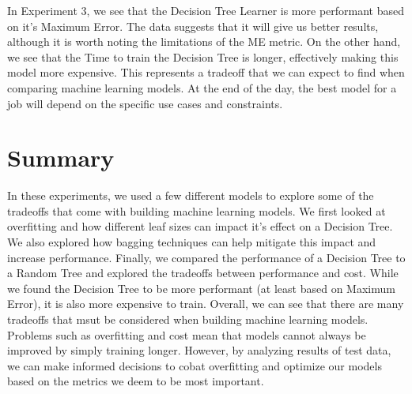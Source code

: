 \documentclass[
	letterpaper, %
]{jdf}
\begin{document}
In Experiment 3, we see that the Decision Tree Learner is more performant based on it's Maximum Error.
The data suggests that it will give us better results, although it is worth noting the limitations of the ME metric.
On the other hand, we see that the Time to train the Decision Tree is longer, effectively making this model more expensive.
This represents a tradeoff that we can expect to find when comparing machine learning models.
At the end of the day, the best model for a job will depend on the specific use cases and constraints.

\section{Summary}
In these experiments, we used a few different models to explore some of the tradeoffs that come with building machine learning models.
We first looked at overfitting and how different leaf sizes can impact it's effect on a Decision Tree.
We also explored how bagging techniques can help mitigate this impact and increase performance.
Finally, we compared the performance of a Decision Tree to a Random Tree and explored the tradeoffs between performance and cost.
While we found the Decision Tree to be more performant (at least based on Maximum Error), it is also more expensive to train.
Overall, we can see that there are many tradeoffs that msut be considered when building machine learning models.
Problems such as overfitting and cost mean that models cannot always be improved by simply training longer.
However, by analyzing results of test data, we can make informed decisions to cobat overfitting and optimize our models based on the metrics we deem to be most important.
\end{document}

